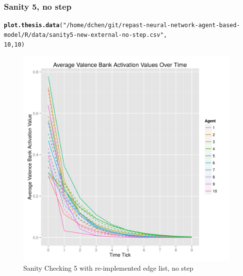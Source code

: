 \documentclass{article}\usepackage[]{graphicx}\usepackage[]{color}
\makeatletter
\def\maxwidth{ %
  \ifdim\Gin@nat@width>\linewidth
    \linewidth
  \else
    \Gin@nat@width
  \fi
}
\newcommand{\hlnum}[1]{\textcolor[rgb]{0.686,0.059,0.569}{#1}}%
\newcommand{\hlstr}[1]{\textcolor[rgb]{0.192,0.494,0.8}{#1}}%
\newcommand{\hlstd}[1]{\textcolor[rgb]{0.345,0.345,0.345}{#1}}%
\newcommand{\hlkwd}[1]{\textcolor[rgb]{0.737,0.353,0.396}{\textbf{#1}}}%
\newenvironment{kframe}{%
 \def\at@end@of@kframe{}%
 \ifinner\ifhmode%
  \def\at@end@of@kframe{\end{minipage}}%
  \begin{minipage}{\columnwidth}%
 \fi\fi%
 \def\FrameCommand##1{\hskip\@totalleftmargin \hskip-\fboxsep
 \colorbox{shadecolor}{##1}\hskip-\fboxsep
     \hskip-\linewidth \hskip-\@totalleftmargin \hskip\columnwidth}%
 \MakeFramed {\advance\hsize-\width
   \@totalleftmargin\z@ \linewidth\hsize
   \@setminipage}}%
 {\par\unskip\endMakeFramed%
 \at@end@of@kframe}
\newenvironment{knitrout}{}{} %
\makeatother
\begin{document}
\subsubsection{Sanity 5, no step}
\begin{knitrout}
\color{fgcolor}\begin{kframe}
\begin{alltt}
\hlkwd{plot.thesis.data}\hlstd{(}\hlstr{"/home/dchen/git/repast-neural-network-agent-based-model/R/data/sanity5-new-external-no-step.csv"}\hlstd{,}
    \hlnum{10}\hlstd{,} \hlnum{10}\hlstd{)}
\end{alltt}
\end{kframe}\begin{figure}[]

\includegraphics[width=\maxwidth]{figure/plot-sanity-5-v2-nostep} \caption[Sanity Checking 5 with re-implemented edge list, no step]{Sanity Checking 5 with re-implemented edge list, no step\label{fig:plot-sanity-5-v2-nostep}}
\end{figure}


\end{knitrout}


\newpage
\end{document}
